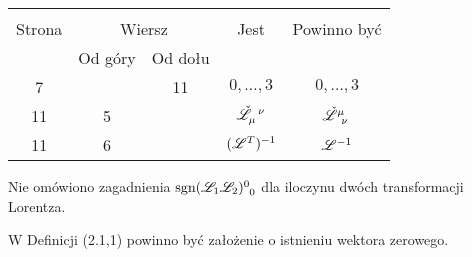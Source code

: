 \documentclass[a4paper,11pt]{article}
\begin{document}
\begin{center}

  \begin{tabular}{|c|c|c|c|c|}
    \hline
    & \multicolumn{2}{c|}{} & & \\
    Strona & \multicolumn{2}{c|}{Wiersz} & Jest
                              & Powinno być \\ \cline{2-3}
    & Od góry & Od dołu & & \\
    \hline
    7   & & 11 & $0,\ldots,\!3$ & $0,\ldots, 3$ \\
    11  &  5 & & $\tensor{ \check{ \Lcal } }{ _{ \mu }^{ \nu } }$
           & $\tensor{ \check{ \Lcal } }{ ^{ \mu }_{ \nu } }$ \\
    11  &  6 & & $( \mathcal{L}^{ T } )^{ -1 }$ & $\mathcal{L}^{ -1 }$ \\
    \hline
  \end{tabular}

\end{center}


\vspace{\spaceTwo}















\vspace{\spaceFour}



\start {} Nie omówiono zagadnienia
$\sgn\tensor{ ( \Lcal_{ 1 } \Lcal_{ 2 } ) }{^{ 0 }_{ 0 }}$ dla iloczynu dwóch
transformacji Lorentza.

\vspace{\spaceFour}



 W Definicji (2.1,1) powinno być założenie o istnieniu
wektora zerowego.
\end{document}
